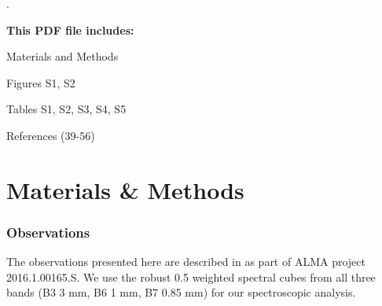 \documentclass[12pt]{article}
\newcounter{lastnote}
\newenvironment{scilastnote}{%
\setcounter{lastnote}{\value{enumiv}}%
\addtocounter{lastnote}{+1}%
\begin{list}%
{\arabic{lastnote}.}
{\setlength{\leftmargin}{.22in}}
{\setlength{\labelsep}{.5em}}}
{\end{list}}
\begin{document}
\begin{scilastnote}
\item[] \textbf{This PDF file includes:}


\vspace{-1em}
Materials and Methods

\vspace{-1em}
Figures S1, S2

\vspace{-1em}
Tables S1, S2, S3, S4, S5

\vspace{-1em}
References (39-56)

 \end{scilastnote}
 
 \clearpage
 
 \part*{Materials \& Methods}

\renewcommand{\thefigure}{S\arabic{figure}}
\renewcommand{\thetable}{S\arabic{table}}
\renewcommand{\theequation}{S\arabic{equation}}
\setcounter{figure}{0}
\setcounter{table}{0}
\setcounter{equation}{0}


\section*{Observations}

The observations presented here are described in \cite{Ginsburg2018b} as part
of ALMA project 2016.1.00165.S.  We use the robust 0.5 weighted spectral cubes
from all three bands (B3 3 mm, B6 1 mm, B7 0.85 mm) for our spectroscopic analysis.
\end{document}
